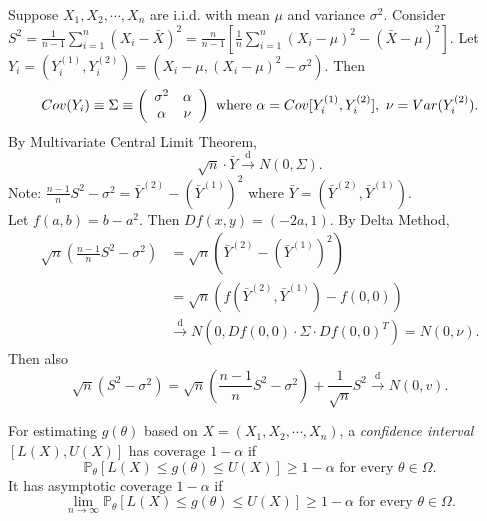\documentclass[a4paper]{article}
\begin{document}
\begin{eg}
	Suppose $X_1, X_2, \cdots, X_n$ are i.i.d. with mean $\mu$ and variance $\sigma^2$. Consider $S^2 = \frac{1}{n-1}\sum\limits_{i=1}^n(X_i - \bar{X})^2 = \frac{n}{n-1}\left[\frac{1}{n}\sum\limits_{i=1}^n(X_i - \mu)^2 - (\bar{X} - \mu)^2\right]$. Let $Y_i = (Y_i^{(1)},Y_i^{(2)}) = \left(X_i-\mu,(X_i-\mu)^2 - \sigma^2\right)$. Then
	\begin{equation*}
		Cov(Y_i) \equiv \Sigma \equiv \left(\begin{array}{c c}
			\sigma^2 & \alpha \\
			\alpha & \nu
		\end{array}\right) \text{ where } \alpha = Cov[Y_i^{(1)},Y_i^{(2)}], \ \nu = Var(Y_i^{(2)}).
	\end{equation*}
	By Multivariate Central Limit Theorem, 
	\begin{equation*}
		\sqrt{n} \cdot \bar{Y} \stackrel{\text{d}}{\longrightarrow} N(0,\Sigma).
	\end{equation*}
	Note: $\frac{n-1}{n} S^2 - \sigma^2 = \bar{Y}^{(2)} - (\bar{Y}^{(1)})^2$ where $\bar{Y} = (\bar{Y}^{(2)},\bar{Y}^{(1)})$.\\
	\newline
	Let $f(a,b) = b - a^2$. Then $Df(x,y) = (-2a,1)$. By Delta Method,
	\begin{equation}
		\begin{aligned}
			\sqrt{n}\left(\frac{n-1}{n}S^2 - \sigma^2\right) &= \sqrt{n}\left(\bar{Y}^{(2)} - (\bar{Y}^{(1)})^2\right) \\
			&= \sqrt{n}(f(\bar{Y}^{(2)},\bar{Y}^{(1)}) - f(0,0)) \\
			& \stackrel{\text{d}}{\longrightarrow} N\left(0,Df(0,0) \cdot \Sigma \cdot Df(0,0)^T\right) = N(0,\nu).
		\end{aligned}
	\end{equation}
	Then also
	\begin{equation}
		\sqrt{n}(S^2 - \sigma^2) = \sqrt{n}\left(\frac{n-1}{n}S^2 - \sigma^2\right) + \frac{1}{\sqrt{n}} S^2 \stackrel{\text{d}}{\longrightarrow} N(0,v).
	\end{equation}
\end{eg}

\begin{defi}
	For estimating $g(\theta)$ based on $X = (X_1, X_2, \cdots, X_n)$, a \emph{confidence interval} $[L(X),U(X)]$ has coverage $1-\alpha$ if
	\begin{equation}
		\mathbb{P}_{\theta}[L(X) \leq g(\theta) \leq U(X)] \geq 1-\alpha \text{ for every } \theta \in \Omega.
	\end{equation}
	It has asymptotic coverage $1-\alpha$ if
	\begin{equation}
		\lim\limits_{n \to \infty} \mathbb{P}_{\theta}[L(X) \leq g(\theta) \leq U(X)] \geq 1-\alpha \text{ for every } \theta \in \Omega.
	\end{equation}
\end{defi}
\end{document}
